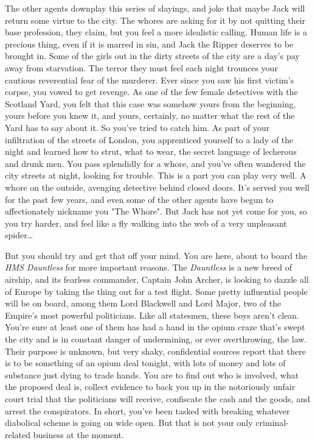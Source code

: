 \documentclass[char]{airship}
\begin{document}
The other agents downplay this series of slayings, and joke that maybe Jack will return some virtue to the city. The whores are asking for it by not quitting their base profession, they claim, but you feel a more idealistic calling. Human life is a precious thing, even if it is marred in sin, and Jack the Ripper deserves to be brought in. Some of the girls out in the dirty streets of the city are a day's pay away from starvation. The terror they must feel each night trounces your cautious reverential fear of the murderer. Ever since you saw his first victim's corpse, you vowed to get revenge. As one of the few female detectives with the Scotland Yard, you felt that this case was somehow yours from the beginning, yours before you knew it, and yours, certainly, no matter what the rest of the Yard has to say about it. So you've tried to catch him. As part of your infiltration of the streets of London, you apprenticed yourself to a lady of the night and learned how to strut, what to wear, the secret language of lecherous and drunk men. You pass splendidly for a whore, and you've often wandered the city streets at night, looking for trouble. This is a part you can play very well. A whore on the outside, avenging detective behind closed doors. It's served you well for the past few years, and even some of the other agents have begun to affectionately nickname you "The Whore". But Jack has not yet come for you, so you try harder, and feel like a fly walking into the web of a very unpleasant spider{\ldots}

But you should try and get that off your mind. You are here, about to board the {\it HMS Dauntless} for more important reasons. The {\it Dauntless} is a new breed of airship, and its fearless commander, Captain John Archer, is looking to dazzle all of Europe by taking the thing out for a test flight. Some pretty influential people will be on board, among them Lord Blackwell and Lord Major, two of the Empire's most powerful politicians. Like all statesmen, these boys aren't clean. You're sure at least one of them has had a hand in the opium craze that's swept the city and is in constant danger of undermining, or ever overthrowing, the law. Their purpose is unknown, but very shaky, confidential sources report that there is to be something of an opium deal tonight, with lots of money and lots of substance just dying to trade hands. You are to find out who is involved, what the proposed deal is, collect evidence to back you up in the notoriously unfair court trial that the politicians will receive, confiscate the cash and the goods, and arrest the conspirators. In short, you've been tasked with breaking whatever diabolical scheme is going on wide open. But that is not your only criminal-related business at the moment.
\end{document}

